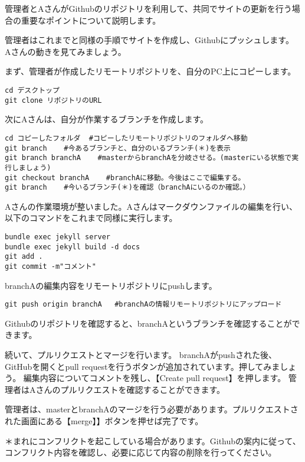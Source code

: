 \documentclass[
]{book}
\begin{document}
管理者とAさんがGithubのリポジトリを利用して、共同でサイトの更新を行う場合の重要なポイントについて説明します。

管理者はこれまでと同様の手順でサイトを作成し、Githubにプッシュします。
Aさんの動きを見てみましょう。

まず、管理者が作成したリモートリポジトリを、自分のPC上にコピーします。

\begin{verbatim}
cd デスクトップ
git clone リポジトリのURL
\end{verbatim}

次にAさんは、自分が作業するブランチを作成します。

\begin{verbatim}
cd コピーしたフォルダ  #コピーしたリモートリポジトリのフォルダへ移動
git branch    #今あるブランチと、自分のいるブランチ(＊)を表示
git branch branchA    #masterからbranchAを分岐させる。(masterにいる状態で実行しましょう)
git checkout branchA    #branchAに移動。今後はここで編集する。
git branch    #今いるブランチ(＊)を確認（branchAにいるのか確認。）
\end{verbatim}

Aさんの作業環境が整いました。Aさんはマークダウンファイルの編集を行い、以下のコマンドをこれまで同様に実行します。

\begin{verbatim}
bundle exec jekyll server
bundle exec jekyll build -d docs
git add .
git commit -m"コメント"
\end{verbatim}

branchAの編集内容をリモートリポジトリにpushします。

\begin{verbatim}
git push origin branchA   #branchAの情報リモートリポジトリにアップロード
\end{verbatim}

Githubのリポジトリを確認すると、branchAというブランチを確認することができます。

続いて、プルリクエストとマージを行います。
branchAがpushされた後、GitHubを開くとpull requestを行うボタンが追加されています。押してみましょう。
編集内容についてコメントを残し、【Create pull request】を押します。
管理者はAさんのプルリクエストを確認することができます。

管理者は、masterとbranchAのマージを行う必要があります。プルリクエストされた画面にある【merge】】ボタンを押せば完了です。

＊まれにコンフリクトを起こしている場合があります。Githubの案内に従って、コンフリクト内容を確認し、必要に応じて内容の削除を行ってください。
\end{document}

